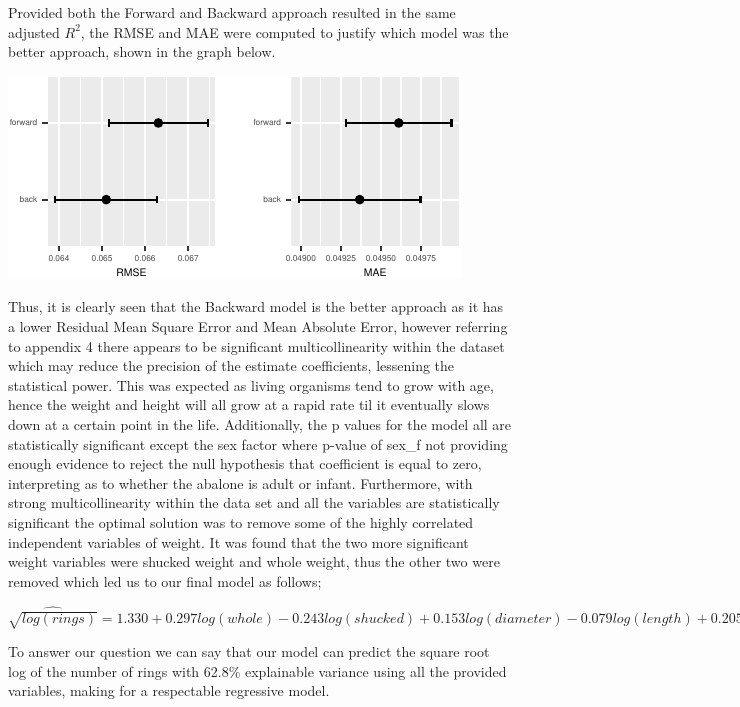 \documentclass[letterpaper,9pt,twocolumn,twoside,]{pinp}
\begin{document}
Provided both the Forward and Backward approach resulted in the same
adjusted \(R^2\), the RMSE and MAE were computed to justify which model
was the better approach, shown in the graph below.

\begin{center}\includegraphics{ExecSum_files/figure-latex/unnamed-chunk-8-1} \end{center}

Thus, it is clearly seen that the Backward model is the better approach
as it has a lower Residual Mean Square Error and Mean Absolute Error,
however referring to appendix 4 there appears to be significant
multicollinearity within the dataset which may reduce the precision of
the estimate coefficients, lessening the statistical power. This was
expected as living organisms tend to grow with age, hence the weight and
height will all grow at a rapid rate til it eventually slows down at a
certain point in the life. Additionally, the p values for the model all
are statistically significant except the sex factor where p-value of
sex\_f not providing enough evidence to reject the null hypothesis that
coefficient is equal to zero, interpreting as to whether the abalone is
adult or infant. Furthermore, with strong multicollinearity within the
data set and all the variables are statistically significant the optimal
solution was to remove some of the highly correlated independent
variables of weight. It was found that the two more significant weight
variables were shucked weight and whole weight, thus the other two were
removed which led us to our final model as follows;

\(\widehat{\sqrt{log(rings)}} = 1.330 + 0.297 log(whole) -0.243 log(shucked) + 0.153 log(diameter) -0.079 log(length) + 0.205\sqrt{height} -0.013 Sex_{infant}\)

To answer our question we can say that our model can predict the square
root log of the number of rings with 62.8\% explainable variance using
all the provided variables, making for a respectable regressive model.
\end{document}
